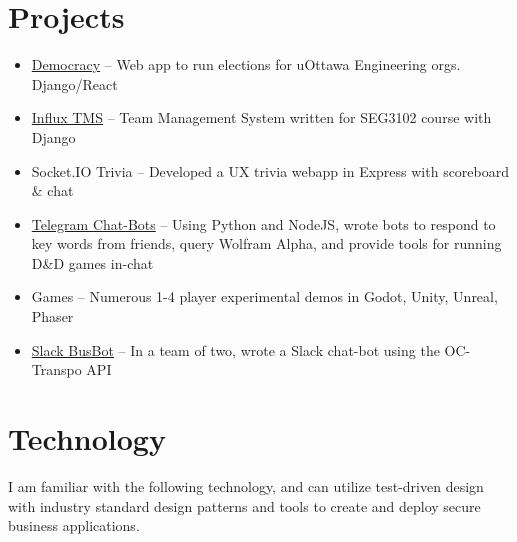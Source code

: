 \documentclass[]{rcf_cv}
\begin{document}
	


	
	\section{Projects}
		\begin{itemize}
			\setlength\itemsep{-0.4em}
			\renewcommand\labelitemi{--}
			
			\item \href{https://github.com/Small-Minds}{Democracy} -- Web app to run elections for uOttawa Engineering orgs. Django/React
			
			\item \href{https://github.com/RyanFleck/Influx}{Influx TMS} -- Team Management System written for SEG3102 course with Django
			
			\item Socket.IO Trivia -- Developed a UX trivia webapp in Express with scoreboard \& chat
			
			\item \href{https://github.com/RyanFleck/Telegram-Dungeon}{Telegram Chat-Bots} -- Using Python and NodeJS, wrote bots to respond to key words from friends, query Wolfram Alpha, and provide tools for running D\&D games in-chat
			
			\item Games -- Numerous 1-4 player experimental demos in Godot, Unity, Unreal, Phaser
			
			\item \href{https://github.com/morch028/BusBot}{Slack BusBot} -- In a team of two, wrote a Slack chat-bot using the OC-Transpo API
			

			
		\end{itemize}


	\section{Technology}
	
		I am familiar with the following technology, and can utilize test-driven design with industry standard design patterns and tools to create and deploy secure business applications.
		
\end{document}
